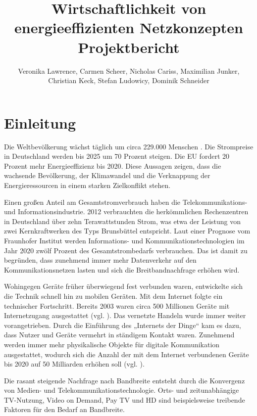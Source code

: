 \documentclass[12pt,titlepage]{article}
\newcommand{\firstpages}{
  

     \newpage
     \tableofcontents{}
     \addtocontents{toc}{~\hfill\textbf{Seite}\par}

     \newpage
     \listoffigures

     \newpage
     \listoftables
     \newpage
}
\begin{document}
\title{\huge{Wirtschaftlichkeit von energieeffizienten Netzkonzepten} \\ \large{Projektbericht}}
\author{Veronika Lawrence, Carmen Scheer, Nicholas Cariss, Maximilian Junker,\\ Christian Keck, Stefan Ludowicy, Dominik Schneider}
\maketitle
\firstpages

\section{Einleitung}
Die Weltbevölkerung wächst täglich um circa 229.000 Menschen \cite{statista:zuwachs}. Die Strompreise in Deutschland werden bis 2025 um 70 Prozent steigen\cite{welt:strompreise}. Die EU fordert 20 Prozent mehr Energieeffizienz bis 2020\cite{bmwi:energiepolitik}. Diese Aussagen zeigen, dass die wachsende Bevölkerung, der Klimawandel und die Verknappung der Energieressourcen in einem starken Zielkonflikt stehen. 


Einen großen Anteil am Gesamtstromverbrauch haben die Telekommunikations- und Informationsindustrie. 2012 verbrauchten die herkömmlichen Rechenzentren in Deutschland über zehn Terawattstunden Strom, was etwa der Leistung von zwei Kernkraftwerken des Typs Brunsbüttel entspricht. Laut einer Prognose vom Fraunhofer Institut werden Informations- und Kommunikationstechnologien im Jahr 2020 zwölf Prozent des Gesamtstrombedarfs verbrauchen\cite{fraunhofer:energiebedarf}. Das ist damit zu begründen, dass zunehmend immer mehr Datenverkehr auf den Kommunikationsnetzen lasten und sich die Breitbandnachfrage erhöhen wird. 



Wohingegen Geräte früher überwiegend fest verbunden waren, entwickelte sich die Technik schnell hin zu mobilen Geräten. Mit dem Internet folgte ein technischer Fortschritt. Bereits 2003 waren circa 500 Millionen Geräte  mit Internetzugang ausgestattet (vgl. \cite{cisco}). Das vernetzte Handeln wurde immer weiter vorangetrieben. Durch die Einführung des „Internets der Dinge“ kam es dazu, dass Nutzer und Geräte vermehrt in ständigem Kontakt waren. Zunehmend werden immer mehr physikalische Objekte für digitale Kommunikation ausgestattet, wodurch sich die Anzahl der mit dem Internet verbundenen Geräte bis 2020 auf 50 Milliarden  erhöhen soll (vgl. \cite{cisco}). 


Die rasant steigende Nachfrage nach Bandbreite entsteht durch die Konvergenz von Medien- und Telekommunikationstechnologie. Orts- und zeitunabhängige TV-Nutzung, Video on Demand, Pay TV und HD sind beispielsweise treibende Faktoren für den Bedarf an Bandbreite.
\end{document}
